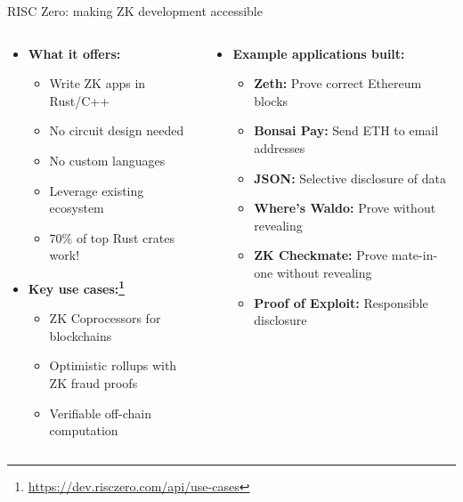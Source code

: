 \documentclass[aspectratio=169, lualatex, handout]{beamer}
\begin{document}
\begin{frame}{RISC Zero: making ZK development accessible}
	\begin{columns}[c]
		\begin{column}{0.5\textwidth}
			\begin{itemize}
				\item \textbf{What it offers:}
				      \begin{itemize}
					      \item Write ZK apps in Rust/C++
					      \item No circuit design needed
					      \item No custom languages
					      \item Leverage existing ecosystem
					      \item 70\% of top Rust crates work!
				      \end{itemize}
				\item \textbf{Key use cases:\footnote{\url{https://dev.risczero.com/api/use-cases}}}
				      \begin{itemize}
					      \item ZK Coprocessors for blockchains
					      \item Optimistic rollups with ZK fraud proofs
					      \item Verifiable off-chain computation
				      \end{itemize}
			\end{itemize}
		\end{column}
		\begin{column}{0.5\textwidth}
			\begin{itemize}
				\item \textbf{Example applications built:}
				      \begin{itemize}
					      \item \textbf{Zeth:} Prove correct Ethereum blocks
					      \item \textbf{Bonsai Pay:} Send ETH to email addresses
					      \item \textbf{JSON:} Selective disclosure of data
					      \item \textbf{Where's Waldo:} Prove without revealing
					      \item \textbf{ZK Checkmate:} Prove mate-in-one without revealing
					      \item \textbf{Proof of Exploit:} Responsible disclosure
				      \end{itemize}
			\end{itemize}
		\end{column}
	\end{columns}
\end{frame}
\end{document}
